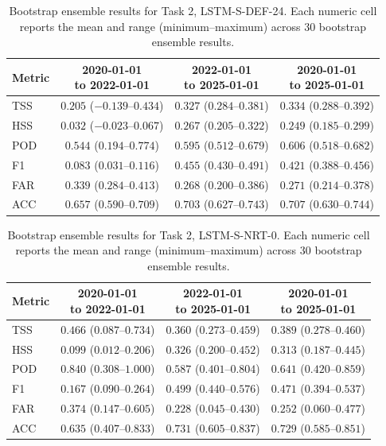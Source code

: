 \begin{table}[htbp]
\centering
\small
\caption{Bootstrap ensemble results for Task 2, LSTM-S-DEF-24. Each numeric cell reports the mean and range (minimum--maximum) across 30 bootstrap ensemble results.}
\label{tab:app-task2-lstm-s-def-24}
\begin{tabular}{lccc}
\toprule
Metric & \shortstack{2020-01-01\\to 2022-01-01} & \shortstack{2022-01-01\\to 2025-01-01} & \shortstack{2020-01-01\\to 2025-01-01} \\
\midrule
TSS & $0.205$ ($-0.139$--$0.434$) & $0.327$ ($0.284$--$0.381$) & $0.334$ ($0.288$--$0.392$) \\
HSS & $0.032$ ($-0.023$--$0.067$) & $0.267$ ($0.205$--$0.322$) & $0.249$ ($0.185$--$0.299$) \\
POD & $0.544$ ($0.194$--$0.774$) & $0.595$ ($0.512$--$0.679$) & $0.606$ ($0.518$--$0.682$) \\
F1 & $0.083$ ($0.031$--$0.116$) & $0.455$ ($0.430$--$0.491$) & $0.421$ ($0.388$--$0.456$) \\
FAR & $0.339$ ($0.284$--$0.413$) & $0.268$ ($0.200$--$0.386$) & $0.271$ ($0.214$--$0.378$) \\
ACC & $0.657$ ($0.590$--$0.709$) & $0.703$ ($0.627$--$0.743$) & $0.707$ ($0.630$--$0.744$) \\
\bottomrule
\end{tabular}
\end{table}
\clearpage

\begin{table}[htbp]
\centering
\small
\caption{Bootstrap ensemble results for Task 2, LSTM-S-NRT-0. Each numeric cell reports the mean and range (minimum--maximum) across 30 bootstrap ensemble results.}
\label{tab:app-task2-lstm-s-nrt-0}
\begin{tabular}{lccc}
\toprule
Metric & \shortstack{2020-01-01\\to 2022-01-01} & \shortstack{2022-01-01\\to 2025-01-01} & \shortstack{2020-01-01\\to 2025-01-01} \\
\midrule
TSS & $0.466$ ($0.087$--$0.734$) & $0.360$ ($0.273$--$0.459$) & $0.389$ ($0.278$--$0.460$) \\
HSS & $0.099$ ($0.012$--$0.206$) & $0.326$ ($0.200$--$0.452$) & $0.313$ ($0.187$--$0.445$) \\
POD & $0.840$ ($0.308$--$1.000$) & $0.587$ ($0.401$--$0.804$) & $0.641$ ($0.420$--$0.859$) \\
F1 & $0.167$ ($0.090$--$0.264$) & $0.499$ ($0.440$--$0.576$) & $0.471$ ($0.394$--$0.537$) \\
FAR & $0.374$ ($0.147$--$0.605$) & $0.228$ ($0.045$--$0.430$) & $0.252$ ($0.060$--$0.477$) \\
ACC & $0.635$ ($0.407$--$0.833$) & $0.731$ ($0.605$--$0.837$) & $0.729$ ($0.585$--$0.851$) \\
\bottomrule
\end{tabular}
\end{table}
\clearpage


